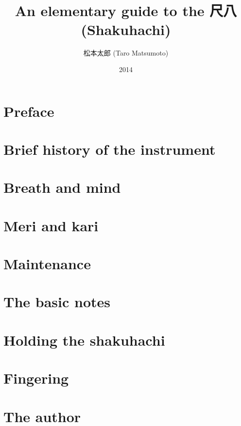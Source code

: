 \documentclass[b5paper]{memoir}
\begin{document}
\frontmatter

\title{\Huge An elementary guide to the 尺八 (Shakuhachi)}
\author{\huge 松本太郎 (Taro Matsumoto)}
\date{\Large 2014}
\maketitle

\cleardoublepage

\tableofcontents
\listoffigures

\cleardoublepage

\section{Preface}


\cleardoublepage

\mainmatter

\section{Brief history of the instrument}


\section{Breath and mind}


\section{Meri and kari}




\enlargethispage{-2.0cm}

\section{Maintenance}


\section{The basic notes}


\section{Holding the shakuhachi}


\appendix
\appendixpage

\section{Fingering}


\clearpage

\section{The author}


\backmatter
\end{document}

